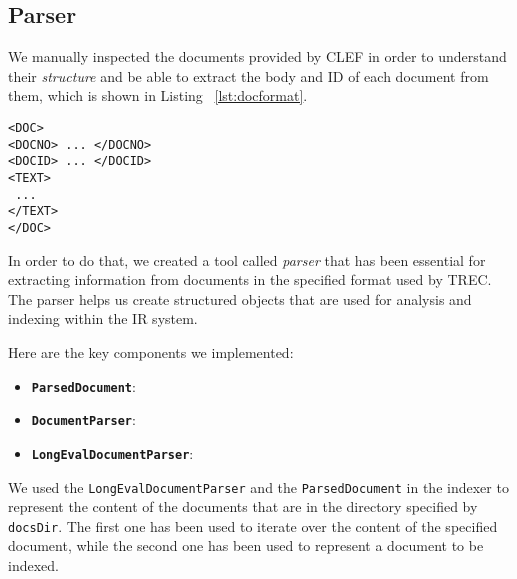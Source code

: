 \subsection{Parser}
\label{subsec:parser}

We manually inspected the documents provided by \ac{CLEF} in order to understand their \emph{structure} and be able to extract the body and ID of each document from them, which is shown in Listing ~\ref{lst:docformat}.

\begin{lstlisting}[label={lst:docformat},caption={Document format},captionpos=b, xleftmargin=.4\textwidth]
<DOC>
<DOCNO> ... </DOCNO>
<DOCID> ... </DOCID>
<TEXT>
 ... 
</TEXT>
</DOC>
\end{lstlisting}

In order to do that, we created a tool called \emph{parser} that has been essential for extracting information from documents in the specified format 
used by \ac{TREC}. The parser helps us create structured objects that are used for analysis and indexing within the \ac{IR} system.

Here are the key components we implemented:
\begin{itemize}
    \item  \textbf{\texttt{ParsedDocument}}: 
    \\
    \item  \textbf{\texttt{DocumentParser}}: 
    \\
    \item  \textbf{\texttt{LongEvalDocumentParser}}: 
\end{itemize}   

We used  the \texttt{LongEvalDocumentParser} and the \texttt{ParsedDocument} in the indexer to represent the content of the documents that are 
in the directory specified by \texttt{docsDir}. The first one has been used to iterate over the content of the specified document, while the second one has been used to represent a document to be indexed.